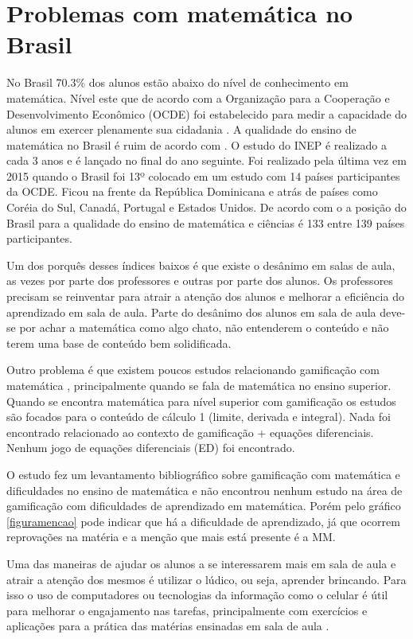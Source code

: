 \section[Problemas com matemática no Brasil]{Problemas com matemática no Brasil}
No Brasil 70.3\% dos alunos estão abaixo do nível de conhecimento em matemática. Nível este que de acordo com a Organização para a Cooperação e Desenvolvimento Econômico (OCDE) foi estabelecido para medir a capacidade do alunos em exercer plenamente sua cidadania \cite{inep2015nivelcidadania}. A qualidade do ensino de matemática no Brasil é ruim de acordo com \cite{indiceRuimMat} \cite{inep2015}. O estudo do INEP é realizado a cada 3 anos e é lançado no final do ano seguinte. Foi realizado pela última vez em 2015 quando o Brasil foi 13º colocado em um estudo com 14 países participantes da OCDE. Ficou na frente da República Dominicana e atrás de países como Coréia do Sul, Canadá, Portugal e Estados Unidos. De acordo com o \cite{indiceRuimMat} a posição do Brasil para a qualidade do ensino de matemática e ciências é 133 entre 139 países participantes.

Um dos porquês desses índices baixos é que existe o desânimo em salas de aula, as vezes por parte dos professores e outras por parte dos alunos. Os professores precisam se reinventar para atrair a atenção dos alunos e melhorar a eficiência do aprendizado em sala de aula. Parte do desânimo dos alunos em sala de aula deve-se por achar a matemática como algo chato, não entenderem o conteúdo e não terem uma base de conteúdo bem solidificada.

Outro problema é que existem poucos estudos relacionando gamificação com matemática \cite{revbibmatgam}, principalmente quando se fala de matemática no ensino superior. Quando se encontra matemática para nível superior com gamificação os estudos são focados para o conteúdo de cálculo 1 (limite, derivada e integral). Nada foi encontrado relacionado ao contexto de gamificação + equações diferenciais. Nenhum jogo de equações diferenciais (ED) foi encontrado.

O estudo \cite{revbibmatgam} fez um levantamento bibliográfico sobre gamificação com matemática e dificuldades no ensino de matemática e não encontrou nenhum estudo na área de gamificação com dificuldades de aprendizado em matemática. Porém pelo gráfico \ref{figuramencao} pode indicar que há a dificuldade de aprendizado, já que ocorrem reprovações na matéria e a menção que mais está presente é a MM.

Uma das maneiras de ajudar os alunos a se interessarem mais em sala de aula e atrair a atenção dos mesmos é utilizar o lúdico, ou seja, aprender brincando. Para isso o uso de computadores ou tecnologias da informação como o celular é útil para melhorar o engajamento nas tarefas, principalmente com exercícios e aplicações para a prática das matérias ensinadas em sala de aula \cite{tdahNasEscolas2}.


